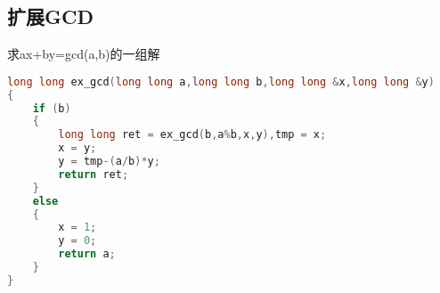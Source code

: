 \subsection{扩展GCD}
	求ax+by=gcd(a,b)的一组解
	\begin{lstlisting}[language=c++]
long long ex_gcd(long long a,long long b,long long &x,long long &y)
{
	if (b)
	{
		long long ret = ex_gcd(b,a%b,x,y),tmp = x;
		x = y;
		y = tmp-(a/b)*y;
		return ret;
	}
	else
	{
		x = 1;
		y = 0;
		return a;
	}
}
	\end{lstlisting} 